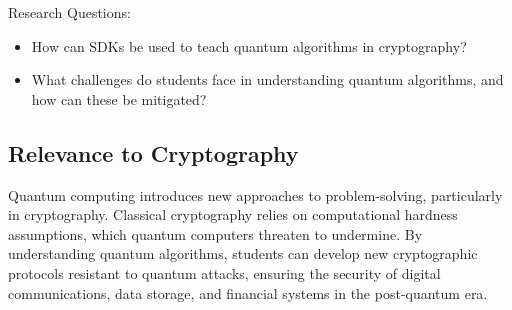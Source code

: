 \documentclass[11pt,a4paper]{article}
\begin{document}
Research Questions:
\begin{itemize}
\item How can SDKs be used to teach quantum algorithms in cryptography?
\item What challenges do students face in understanding quantum algorithms, and how can these be mitigated?
\end{itemize}




\subsection{Relevance to Cryptography}

Quantum computing introduces new approaches to problem-solving, particularly in cryptography.
Classical cryptography relies on computational hardness assumptions, which quantum computers threaten to undermine.
By understanding quantum algorithms, students can develop new cryptographic protocols resistant to quantum attacks, 
ensuring the security of digital communications, data storage, and financial systems in the post-quantum era.
\end{document}
